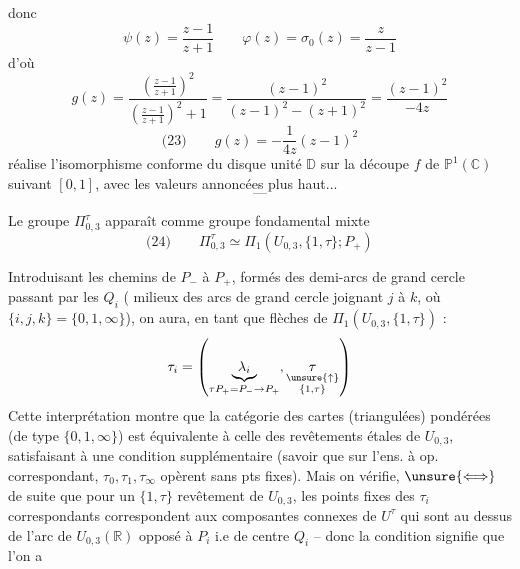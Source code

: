 donc \deleted{$\unsure{\varphi}$}
\[
\psi(z)=\frac{z-1}{z+1}\qquad
\varphi(z)=\sigma_0(z)=\frac{z}{z-1}
\]
d'où
\[
g(z)=\frac{\left(\frac{z-1}{z+1}\right)^2}{\left(\frac{z-1}{z+1}\right)^2+1}
=\frac{(z-1)^2}{(z-1)^2-(z+1)^2}
=\frac{(z-1)^2}{-4z}
\]
\[
\text{(23)}\qquad g(z)=-\frac1{4z}(z-1)^2
\]
réalise l'isomorphisme conforme du disque unité $\mathbb D$ sur la découpe $f$ de $\mathbb P^1(\mathbb C)$ suivant $[0,1]$, avec les valeurs annoncées plus haut...
\[
\text{---}
\]

Le groupe $\Pi_{0,3}^{\tau}$ apparaît comme groupe fondamental mixte
\[
\text{(24)}\qquad
\Pi_{0,3}^{\tau}\simeq\Pi_1(U_{0,3},\{1,\tau\};P_+)
\]

Introduisant les chemins  de $P_-$ à $P_+$, formés des demi-arcs de grand cercle passant par les $Q_i$ ( milieux des arcs de grand cercle joignant $j$ à $k$, où $\{i,j,k\}=\{0,1,\infty\}$), on aura, en tant que flèches de $\Pi_1(U_{0,3},\{1,\tau\})$ :
\[
\tau_i=\left(\underbrace{\lambda_i}_{\tau P_+=P_-\to P_+},
\underset{\substack{\unsure{\uparrow}\\\{1,\tau\}}}{\tau}\right)
\]
Cette interprétation montre que la catégorie  des cartes (triangulées) pondérées (de type $\{0,1,\infty\}$) est équivalente à  celle des revêtements  étales de $U_{0,3}$,  satisfaisant à une condition supplémentaire (savoir que sur l'ens. à op. correspondant, $\tau_0,\tau_1,\tau_\infty$ opèrent sans pts fixes). Mais on vérifie, $\unsure{\Longleftrightarrow}$ de suite que  pour un $\{1,\tau\}$ revêtement de $U_{0,3}$, les points fixes des $\tau_i$ correspondants correspondent aux composantes connexes de $U^\tau$ qui sont au dessus de l'arc de $U_{0,3}(\mathbb R)$ opposé à $P_i$ i.e  de centre $Q_i$ -- donc la condition signifie que  l'on a
